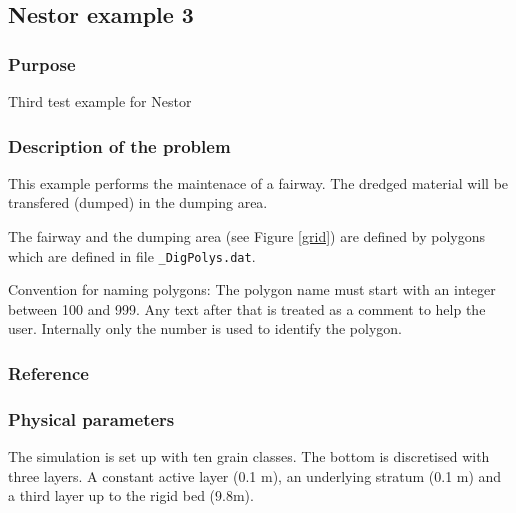 \subsection{Nestor example 3}
%

%
\subsubsection{Purpose}
%
Third test example for Nestor
%
\subsubsection{Description of the problem}
%
This example performs the maintenace of a fairway. The dredged material will be transfered (dumped) in the dumping area.


The fairway and the dumping area (see Figure \ref{grid}) are defined by polygons which are defined in file \texttt{\_DigPolys.dat}.



Convention for naming polygons: The polygon name must start with an integer between 100 and 999. Any text after that is treated as a comment to  help the user. 
Internally only the number is used to identify the polygon. 


%
%
\subsubsection{Reference}
%

%
%
\subsubsection{Physical parameters}
%
The simulation is set up with ten grain classes. 
The bottom is discretised with three layers. A constant active layer (0.1 m), an underlying stratum (0.1 m) and a third layer up to the rigid bed (9.8m).  

